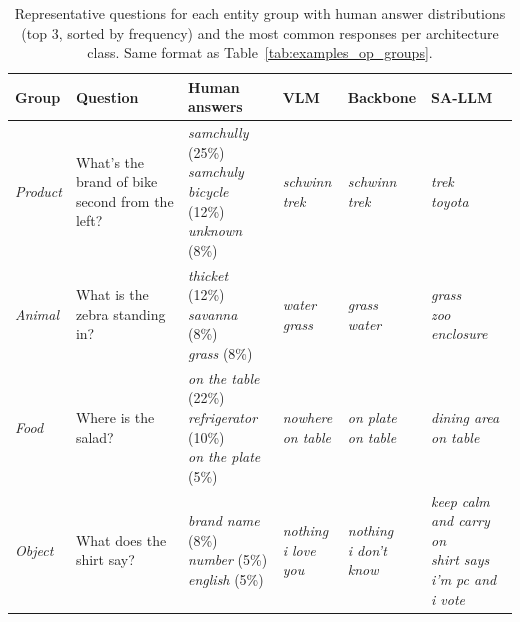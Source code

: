 \begin{table}[t]
\centering
\scriptsize
\setlength{\tabcolsep}{4pt}
\renewcommand{\arraystretch}{1.15}
\caption{Representative questions for each entity group with human answer distributions (top 3, sorted by frequency) and the most common responses per architecture class. Same format as Table~\ref{tab:examples_op_groups}.}
\label{tab:examples_ent_groups}
\begin{tabular}{>{\raggedright\arraybackslash}p{1.0cm}>{\raggedright\arraybackslash}p{4.4cm}>{\raggedright\arraybackslash}p{3.6cm}>{\raggedright\arraybackslash}p{2.2cm}>{\raggedright\arraybackslash}p{2.2cm}>{\raggedright\arraybackslash}p{2.2cm}}
\toprule
\textbf{Group} & \textbf{Question} & \textbf{Human answers} & \textbf{VLM} & \textbf{Backbone} & \textbf{SA-LLM} \\
\midrule
\textit{Product} & What's the brand of bike second from the left? & \makecell[l]{\textit{samchully} (25\%) \\ \textit{samchuly bicycle} (12\%) \\ \textit{unknown} (8\%)} & \makecell[l]{\textit{schwinn} \\ \textit{trek}} & \makecell[l]{\textit{schwinn} \\ \textit{trek}} & \makecell[l]{\textit{trek} \\ \textit{toyota}} \\
\midrule
\textit{Animal} & What is the zebra standing in? & \makecell[l]{\textit{thicket} (12\%) \\ \textit{savanna} (8\%) \\ \textit{grass} (8\%)} & \makecell[l]{\textit{water} \\ \textit{grass}} & \makecell[l]{\textit{grass} \\ \textit{water}} & \makecell[l]{\textit{grass} \\ \textit{zoo enclosure}} \\
\midrule
\textit{Food} & Where is the salad? & \makecell[l]{\textit{on the table} (22\%) \\ \textit{refrigerator} (10\%) \\ \textit{on the plate} (5\%)} & \makecell[l]{\textit{nowhere} \\ \textit{on table}} & \makecell[l]{\textit{on plate} \\ \textit{on table}} & \makecell[l]{\textit{dining area} \\ \textit{on table}} \\
\midrule
\textit{Object} & What does the shirt say? & \makecell[l]{\textit{brand name} (8\%) \\ \textit{number} (5\%) \\ \textit{english} (5\%)} & \makecell[l]{\textit{nothing} \\ \textit{i love you}} & \makecell[l]{\textit{nothing} \\ \textit{i don't know}} & \makecell[l]{\textit{keep calm and carry on} \\ \textit{shirt says i'm pc and i vote}} \\

\end{tabular}
\end{table}
